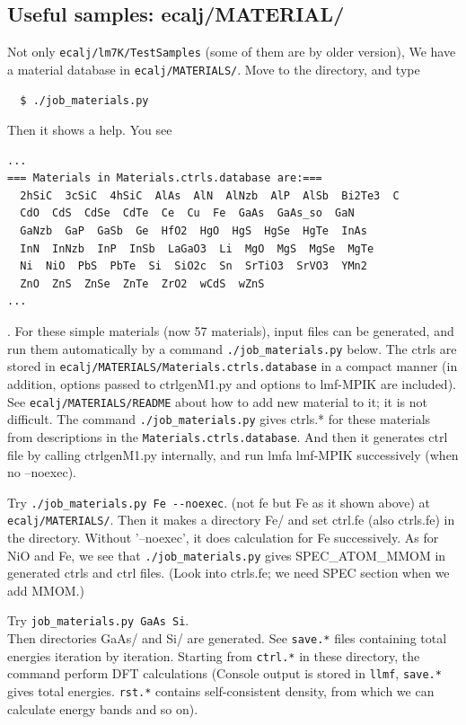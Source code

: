 \documentclass[a4paper,10pt,epsf,fleqn]{article}
\begin{document}
\subsection{Useful samples: ecalj/MATERIAL/}
Not only \verb+ecalj/lm7K/TestSamples+ (some of them are by older version),
We have a material database in \verb+ecalj/MATERIALS/+. 
Move to the directory, and type  
\begin{verbatim}
  $ ./job_materials.py
\end{verbatim}
Then it shows a help. You see 
\begin{verbatim}
...
=== Materials in Materials.ctrls.database are:===
  2hSiC  3cSiC  4hSiC  AlAs  AlN  AlNzb  AlP  AlSb  Bi2Te3  C
  CdO  CdS  CdSe  CdTe  Ce  Cu  Fe  GaAs  GaAs_so  GaN
  GaNzb  GaP  GaSb  Ge  HfO2  HgO  HgS  HgSe  HgTe  InAs
  InN  InNzb  InP  InSb  LaGaO3  Li  MgO  MgS  MgSe  MgTe
  Ni  NiO  PbS  PbTe  Si  SiO2c  Sn  SrTiO3  SrVO3  YMn2
  ZnO  ZnS  ZnSe  ZnTe  ZrO2  wCdS  wZnS
...
\end{verbatim}
. For these simple materials (now 57 materials), input files can be generated,
and run them automatically by a command \verb+./job_materials.py+ below.
The ctrls are stored in \verb+ecalj/MATERIALS/Materials.ctrls.database+
in a compact manner
(in addition, options passed to ctrlgenM1.py and options to lmf-MPIK are
included). See \verb+ecalj/MATERIALS/README+ about how to add new
material to it; it is not difficult. 
The command \verb+./job_materials.py+ gives ctrls.* for these materials
from descriptions in the \verb+Materials.ctrls.database+.
And then it generates ctrl file by calling ctrlgenM1.py internally, 
and run lmfa lmf-MPIK successively (when no --noexec).

Try \verb+./job_materials.py Fe --noexec+. (not fe but Fe as it shown above)
at \verb+ecalj/MATERIALS/+. 
Then it makes a directory Fe/ and set ctrl.fe (also ctrls.fe) in the
directory. Without '--noexec', it does calculation for Fe successively.
As for NiO and Fe, we see that \verb+./job_materials.py+ gives
SPEC\_ATOM\_MMOM in generated ctrls and ctrl files.
(Look into ctrls.fe; we need SPEC section when we add MMOM.)

Try \verb+job_materials.py GaAs Si+.\\
Then directories GaAs/ and Si/ are generated. See \verb+save.*+ files containing
total energies iteration by iteration. Starting from \verb+ctrl.*+ in
these directory, the command perform DFT calculations 
(Console output is stored in \verb+llmf+, \verb+save.*+ gives
total energies. \verb+rst.*+ contains self-consistent
density, from which we can calculate energy bands and so on).
\end{document}
